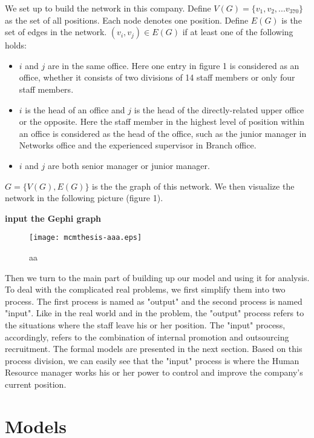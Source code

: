 \documentclass[tcn = 37075, sheet = true, abstract = true]{mcmthesis}
\begin{document}
We set up to build the network in this company. Define $V(G)=\{v_1,v_2,...v_{370}\}$ as the set of all positions. Each node denotes one position. Define $E(G)$ is the set of edges in the network. $(v_i,v_j)\in E(G)$ if at least one of the following holds:


\begin{itemize}
\item $i$ and $j$ are in the same office. Here one entry in figure 1 is considered as an office, whether it consists of two divisions of 14 staff members or only four staff members.
\item $i$ is the head of an office and $j$ is the head of the directly-related upper office or the opposite. Here the staff member in the highest level of position within an office is considered as the head of the office, such as the junior manager in Networks office and the experienced supervisor in Branch office.
\item $i$ and $j$ are both senior manager or junior manager.
\end{itemize}

$G=\{V(G),E(G)\}$ is the the graph of this network. We then visualize the network in the following picture (figure 1).

\textbf{input the Gephi graph}

\begin{figure}[htb!]
\small
\centering
\texttt{[image: mcmthesis-aaa.eps]}
\caption{aa} \label{fig:aa}
\end{figure}

Then we turn to the main part of building up our model and using it for analysis. To deal with the complicated real problems, we first simplify them into two process. The first process is named as "output" and the second process is named "input". Like in the real world and in the problem, the "output" process refers to the situations where the staff leave his or her position. The "input" process, accordingly, refers to the combination of internal promotion and outsourcing recruitment. The formal models are presented in the next section. Based on this process division, we can easily see that the "input" process is where the Human Resource manager works his or her power to control and improve the company's current position.


\section{Models}
\end{document}

